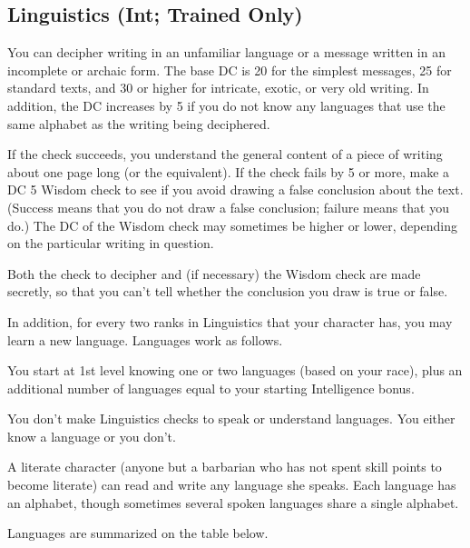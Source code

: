 \subsection{Linguistics (Int; Trained Only)}
 You can decipher writing in an unfamiliar language or a message written in an incomplete or archaic form. The base DC is 20 for the simplest messages, 25 for standard texts, and 30 or higher for intricate, exotic, or very old writing. In addition, the DC increases by 5 if you do not know any languages that use the same alphabet as the writing being deciphered.

If the check succeeds, you understand the general content of a piece of writing about one page long (or the equivalent). If the check fails by 5 or more, make a DC 5 Wisdom check to see if you avoid drawing a false conclusion about the text. (Success means that you do not draw a false conclusion; failure means that you do.) The DC of the Wisdom check may sometimes be higher or lower, depending on the particular writing in question.

Both the check to decipher and (if necessary) the Wisdom check are made secretly, so that you can't tell whether the conclusion you draw is true or false.

In addition, for every two ranks in Linguistics that your character has, you may learn a new language. Languages work as follows.
\begin{itemize*}
\item You start at 1st level knowing one or two languages (based on your race), plus an additional number of languages equal to your starting Intelligence bonus.
\item You don't make Linguistics checks to speak or understand languages. You either know a language or you don't.
\item A literate character (anyone but a barbarian who has not spent skill points to become literate) can read and write any language she speaks. Each language has an alphabet, though sometimes several spoken languages share a single alphabet.
\end{itemize*}

Languages are summarized on the table below.

